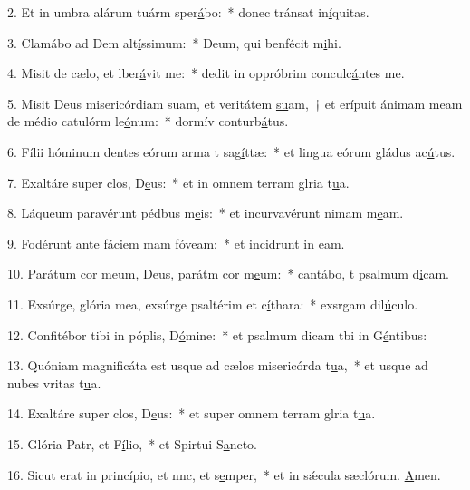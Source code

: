 2. Et in umbra alárum tuárm sper\uline{á}bo:~* donec tránsat in\uline{í}quitas.\par 
3. Clamábo ad Dem alt\uline{í}ssimum:~* Deum, qui benfécit m\uline{i}hi.\par 
4. Misit de cælo, et lber\uline{á}vit me:~* dedit in oppróbrim conculc\uline{á}ntes me.\par 
5. Misit Deus misericórdiam suam, et veritátem \uline{su}am,~† et erípuit ánimam meam de médio catulórm le\uline{ó}num:~* dormív conturb\uline{á}tus.\par 
6. Fílii hóminum dentes eórum arma t sag\uline{í}ttæ:~* et lingua eórum gládus ac\uline{ú}tus.\par 
7. Exaltáre super clos, D\uline{e}us:~* et in omnem terram glria t\uline{u}a.\par 
8. Láqueum paravérunt pédbus m\uline{e}is:~* et incurvavérunt nimam m\uline{e}am.\par 
9. Fodérunt ante fáciem mam f\uline{ó}veam:~* et incidrunt in \uline{e}am.\par 
10. Parátum cor meum, Deus, parátm cor m\uline{e}um:~* cantábo, t psalmum d\uline{i}cam.\par 
11. Exsúrge, glória mea, exsúrge psaltérim et c\uline{í}thara:~* exsrgam dil\uline{ú}culo.\par 
12. Confitébor tibi in póplis, D\uline{ó}mine:~* et psalmum dicam tbi in G\uline{é}ntibus:\par 
13. Quóniam magnificáta est usque ad cælos misericórda t\uline{u}a,~* et usque ad nubes vritas t\uline{u}a.\par 
14. Exaltáre super clos, D\uline{e}us:~* et super omnem terram glria t\uline{u}a.\par 
15. Glória Patr, et F\uline{í}lio,~* et Spirtui S\uline{a}ncto.\par 
16. Sicut erat in princípio, et nnc, et s\uline{e}mper,~* et in sǽcula sæclórum. \uline{A}men.\par 
